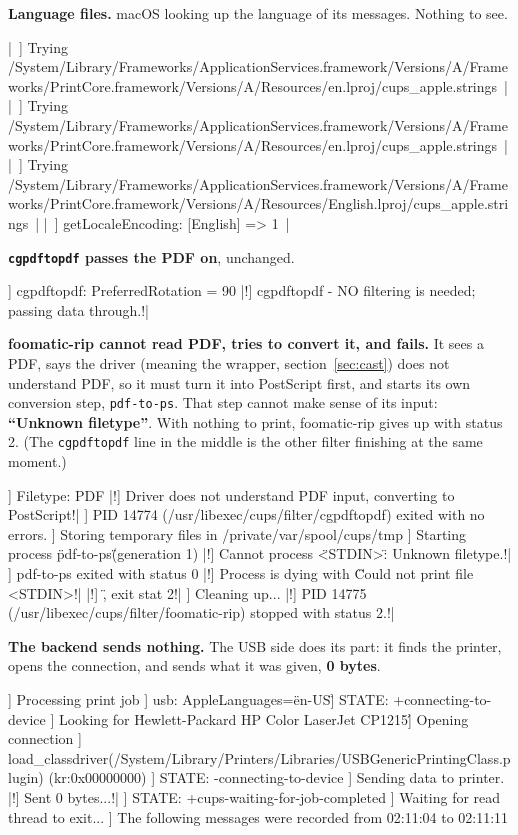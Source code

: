 \documentclass[11pt,a4paper]{article}
\begin{document}
\textbf{Language files.} macOS looking up the language of its messages. Nothing to see.

\begin{cmdout}
|~] Trying /System/Library/Frameworks/ApplicationServices.framework/Versions/A/Frameworks/PrintCore.framework/Versions/A/Resources/en.lproj/cups_apple.strings~|
|~] Trying /System/Library/Frameworks/ApplicationServices.framework/Versions/A/Frameworks/PrintCore.framework/Versions/A/Resources/en.lproj/cups_apple.strings~|
|~] Trying /System/Library/Frameworks/ApplicationServices.framework/Versions/A/Frameworks/PrintCore.framework/Versions/A/Resources/English.lproj/cups_apple.strings~|
|~] getLocaleEncoding: [English] => 1~|
\end{cmdout}

\textbf{\texttt{cgpdftopdf} passes the PDF on}, unchanged.

\begin{cmdout}
] cgpdftopdf: PreferredRotation = 90
|!] cgpdftopdf - NO filtering is needed; passing data through.!|
\end{cmdout}

\textbf{foomatic-rip cannot read PDF, tries to convert it, and fails.} It sees a PDF, says the driver (meaning the wrapper, section~\ref{sec:cast}) does not understand PDF, so it must turn it into PostScript first, and starts its own conversion step, \texttt{pdf-to-ps}. That step cannot make sense of its input: \textbf{``Unknown filetype''}. With nothing to print, foomatic-rip gives up with status 2. (The \texttt{cgpdftopdf} line in the middle is the other filter finishing at the same moment.)

\begin{cmdout}
] Filetype: PDF
|!] Driver does not understand PDF input, converting to PostScript!|
] PID 14774 (/usr/libexec/cups/filter/cgpdftopdf) exited with no errors.
] Storing temporary files in /private/var/spool/cups/tmp
] Starting process \"pdf-to-ps\" (generation 1)
|!] Cannot process \"<STDIN>\": Unknown filetype.!|
] pdf-to-ps exited with status 0
|!] Process is dying with \"Could not print file <STDIN>!|
|!] \", exit stat 2!|
] Cleaning up...
|!] PID 14775 (/usr/libexec/cups/filter/foomatic-rip) stopped with status 2.!|
\end{cmdout}

\textbf{The backend sends nothing.} The USB side does its part: it finds the printer, opens the connection, and sends what it was given, \textbf{0 bytes}.

\begin{cmdout}
] Processing print job
] usb: AppleLanguages=\"en-US\"
] STATE: +connecting-to-device
] Looking for \'Hewlett-Packard HP Color LaserJet CP1215\'
] Opening connection
] load_classdriver(/System/Library/Printers/Libraries/USBGenericPrintingClass.plugin) (kr:0x00000000)
] STATE: -connecting-to-device
] Sending data to printer.
|!] Sent 0 bytes...!|
] STATE: +cups-waiting-for-job-completed
] Waiting for read thread to exit...
] The following messages were recorded from 02:11:04 to 02:11:11
\end{cmdout}
\end{document}
